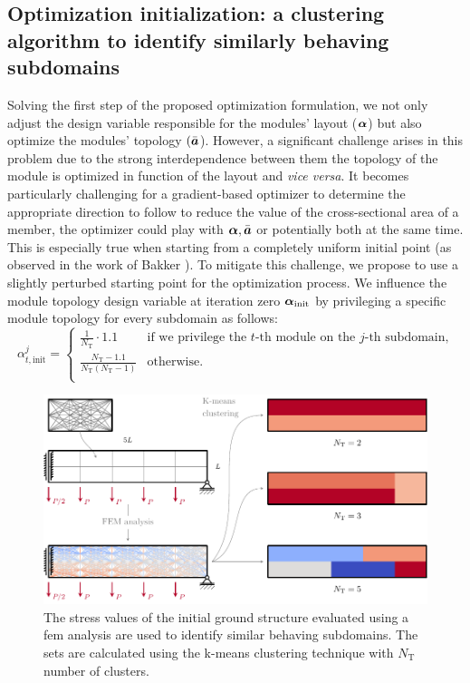 \subsection{Optimization initialization: a clustering algorithm to identify similarly behaving subdomains}
Solving the first step of the proposed optimization formulation, we not only adjust the design variable responsible for the modules' layout ($\bm{\alpha}$) but also optimize the modules' topology $(\bar{\bm{a}}$). However, a significant challenge arises in this problem due to the strong interdependence between them \ie the topology of the module is optimized in function of the layout and \textit{vice versa}. It becomes particularly challenging for a gradient-based optimizer to determine the appropriate direction to follow \eg to reduce the value of the cross-sectional area of a member, the optimizer could play with $\bm{\alpha}, \bar{\bm{a}}$ or potentially both at the same time. This is especially true when starting from a completely uniform initial point (as observed in the work of Bakker ). To mitigate this challenge, we propose to use a slightly perturbed starting point for the optimization process. We influence the module topology design variable at iteration zero $\bm{\alpha}_\text{init}$ by privileging a specific module topology for every subdomain as follows:
\begin{equation}
    \alpha_{t,\text{init}}^j =
    \begin{cases}
        \frac{1}{N_\text{T}} \cdot 1.1  & \text{if we privilege the $t$-th module on the $j$-th subdomain,}\\
        \frac{N_\text{T} - 1.1}{N_\text{T}(N_\text{T} - 1)} & \text{otherwise.} \\
    \end{cases}  
\end{equation}

\begin{figure}
    \centering
    \includegraphics{figures/06_DMO/00_stress_clustering/stress_clustering.pdf}
    \caption{The stress values of the initial ground structure evaluated using a \gls{fem} analysis are used to identify similar behaving subdomains. The sets are calculated using the k-means clustering technique with $N_\text{T}$ number of clusters.}
    \label{fig:06_kmeans}
\end{figure}

